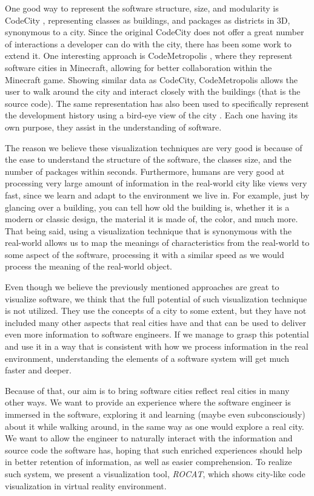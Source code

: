 \documentclass[conference]{IEEEtran}
\begin{document}
One good way to represent the software structure, size, and modularity is CodeCity \cite{Wettel:2011:SSC:1985793.1985868}, representing classes as buildings, and packages as districts in 3D, synonymous to a city.
Since the original CodeCity does not offer a great number of interactions a developer can do with the city, there has been some work to extend it.
One interesting approach is CodeMetropolis \cite{6648194}, where they represent software cities in Minecraft, allowing for better collaboration within the Minecraft game.
Showing similar data as CodeCity, CodeMetropolis allows the user to walk around the city and interact closely with the buildings (that is the source code).
The same representation has also been used to specifically represent the development history using a bird-eye view of the city \cite{Steinbruckner:2010:RDH:1879211.1879239}.
Each one having its own purpose, they assist in the understanding of software.

The reason we believe these visualization techniques are very good is because of the ease to understand the structure of the software, the classes size, and the number of packages within seconds.
Furthermore, humans are very good at processing very large amount of information in the real-world city like views very fast, since we learn and adapt to the environment we live in.
For example, just by glancing over a building, you can tell how old the building is, whether it is a modern or classic design, the material it is made of, the color, and much more.
That being said, using a visualization technique that is synonymous with the real-world allows us to map the meanings of characteristics from the real-world to some aspect of the software, processing it with a similar speed as we would process the meaning of the real-world object.

Even though we believe the previously mentioned approaches are great to visualize software, we think that the full potential of such visualization technique is not utilized.
They use the concepts of a city to some extent, but they have not included many other aspects that real cities have and that can be used to deliver even more information to software engineers.
If we manage to grasp this potential and use it in a way that is consistent with how we process information in the real environment, understanding the elements of a software system will get much faster and deeper.

Because of that, our aim is to bring software cities reflect real cities in many other ways.
We want to provide an experience where the software engineer is immersed in the software, exploring it and learning (maybe even subconsciously) about it while walking around, in the same way as one would explore a real city.
We want to allow the engineer to naturally interact with the information and source code the software has, hoping that such enriched experiences should help in better retention of information, as well as easier comprehension.
To realize such system, we present a visualization tool, \textit{ROCAT}, which shows city-like code visualization in virtual reality environment.
\end{document}
